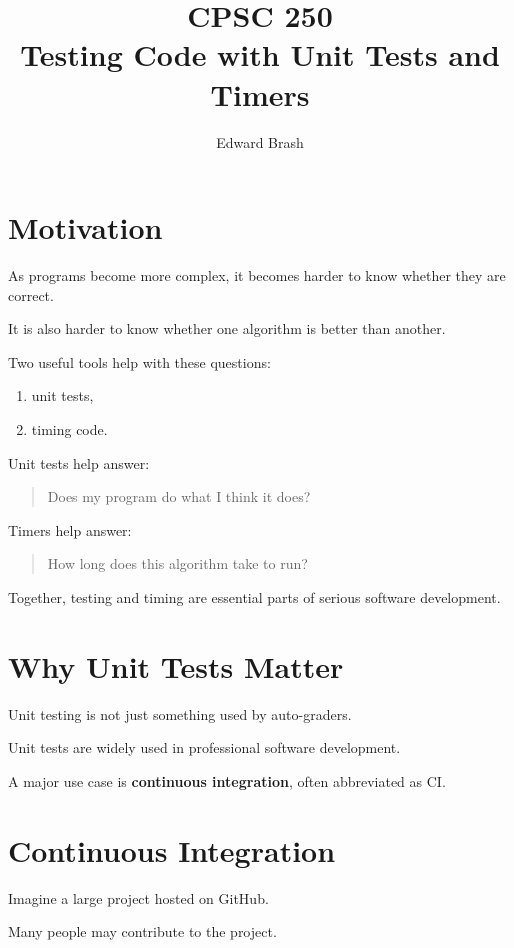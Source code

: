 \documentclass[11pt]{article}
\title{CPSC 250 \\ Testing Code with Unit Tests and Timers}
\author{Edward Brash}
\date{}
\begin{document}
\maketitle

\section{Motivation}

As programs become more complex, it becomes harder to know whether they are correct.

It is also harder to know whether one algorithm is better than another.

Two useful tools help with these questions:

\begin{enumerate}
    \item unit tests,
    \item timing code.
\end{enumerate}

Unit tests help answer:

\begin{quote}
Does my program do what I think it does?
\end{quote}

Timers help answer:

\begin{quote}
How long does this algorithm take to run?
\end{quote}

Together, testing and timing are essential parts of serious software development.

\section{Why Unit Tests Matter}

Unit testing is not just something used by auto-graders.

Unit tests are widely used in professional software development.

A major use case is \textbf{continuous integration}, often abbreviated as CI.

\section{Continuous Integration}

Imagine a large project hosted on GitHub.

Many people may contribute to the project.
\end{document}
